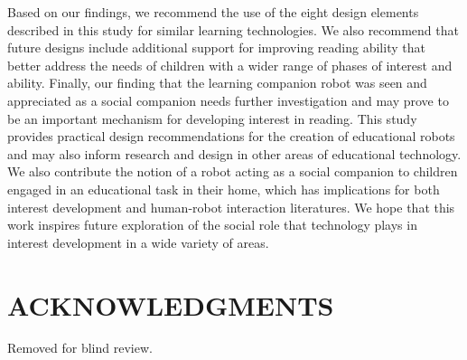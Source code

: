 \documentclass{sigchi}
\begin{document}
Based on our findings, we recommend the use of the eight design elements described in this study for similar learning technologies. We also recommend that future designs include additional support for improving reading ability that better address the needs of children with a wider range of phases of interest and ability. Finally, our finding that the learning companion robot was seen and appreciated as a social companion needs further investigation and may prove to be an important mechanism for developing interest in reading. This study provides practical design recommendations for the creation of educational robots and may also inform research and design in other areas of educational technology. We also contribute the notion of a robot acting as a social companion to children engaged in an educational task in their home, which has implications for both interest development and human-robot interaction literatures. We hope that this work inspires future exploration of the social role that technology plays in interest development in a wide variety of areas.

\section{ACKNOWLEDGMENTS}
Removed for blind review.

\balance{}



\end{document}
